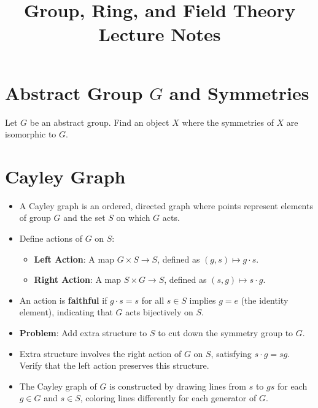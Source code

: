 \documentclass{article}
\begin{document}
\title{Group, Ring, and Field Theory Lecture Notes}
\author{}
\date{}
\maketitle

\section*{Abstract Group $G$ and Symmetries}
Let $G$ be an abstract group. Find an object $X$ where the symmetries of $X$ are isomorphic to $G$.

\section*{Cayley Graph}
\begin{itemize}
    \item A Cayley graph is an ordered, directed graph where points represent elements of group $G$ and the set $S$ on which $G$ acts.
    \item Define actions of $G$ on $S$:
    \begin{itemize}
        \item \textbf{Left Action}: A map \( G \times S \to S \), defined as \( (g, s) \mapsto g \cdot s \).
        \item \textbf{Right Action}: A map \( S \times G \to S \), defined as \( (s, g) \mapsto s \cdot g \).
    \end{itemize}
    \item An action is \textbf{faithful} if \( g \cdot s = s \) for all \( s \in S \) implies \( g = e \) (the identity element), indicating that \( G \) acts bijectively on \( S \).
    \item \textbf{Problem}: Add extra structure to $S$ to cut down the symmetry group to $G$.
    \item Extra structure involves the right action of $G$ on $S$, satisfying \( s \cdot g = sg \). Verify that the left action preserves this structure.
    \item The Cayley graph of $G$ is constructed by drawing lines from $s$ to $gs$ for each $g \in G$ and $s \in S$, coloring lines differently for each generator of $G$.
\end{itemize}
\end{document}
